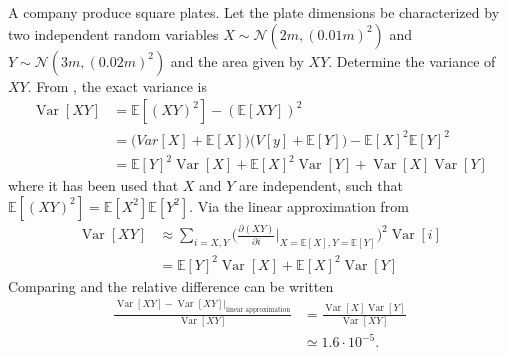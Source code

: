 \begin{example}
	A company produce square plates. Let the plate dimensions be characterized by two independent random variables $X\sim \mathcal{N}(2m,(0.01m)^2)$ and $Y\sim \mathcal{N}(3m,(0.02m)^2)$ and the area given by $XY$. Determine the variance of $XY$. From , the exact variance is
	\begin{equation}
		\label{eq:var1}
		\begin{split}
			\operatorname{Var}[XY]&=\mathbb{E}[(XY)^2]-(\mathbb{E}[XY])^2\\
			&=\bigg(Var[X]+\mathbb{E}[X]\bigg)\bigg(V[y]+\mathbb{E}[Y]\bigg)-\mathbb{E}[X]^2\mathbb{E}[Y]^2\\
			&=\mathbb{E}[Y]^2\operatorname{Var}[X]+\mathbb{E}[X]^2\operatorname{Var}[Y]+\operatorname{Var}[X]\operatorname{Var}[Y]
		\end{split}
	\end{equation}
	where it has been used that $X$ and $Y$ are independent, such that $\mathbb{E}[(XY)^2]=\mathbb{E}[X^2]\mathbb{E}[Y^2]$.	Via the linear approximation from 
	\begin{equation}
		\label{eq:var2}
		\begin{split}
			\operatorname{Var}[XY]&\approx\sum_{i = X,Y} \bigg( \frac{\partial (XY)}{\partial i}\bigg|_{X = \mathbb{E}[X],Y = \mathbb{E}[Y]}  \bigg)^2\operatorname{Var}[i]\\
			&=\mathbb{E}[Y]^2\operatorname{Var}[X]+\mathbb{E}[X]^2\operatorname{Var}[Y]
		\end{split}
	\end{equation}
	Comparing  and  the relative difference can be written
	\begin{equation}
		\begin{split}
			\frac{\operatorname{Var}[XY]-\operatorname{Var}[XY]|_{\text{linear approximation}}}{\operatorname{Var}[XY]} &= \frac{\operatorname{Var}[X]\operatorname{Var}[Y]}{\operatorname{Var}[XY]}\\
			& \simeq 1.6\cdot 10^{-5}.
		\end{split}
	\end{equation}
	
\end{example}

